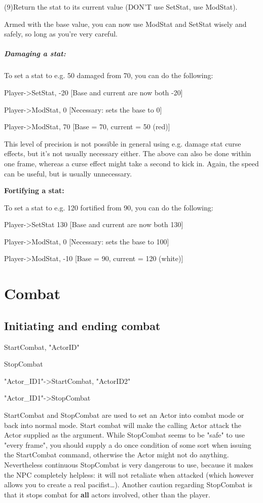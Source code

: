 \documentclass[
]{article}
\begin{document}
(9)Return the stat to its current value (DON'T use SetStat, use
ModStat).

Armed with the base value, you can now use ModStat and SetStat wisely
and safely, so long as you're very careful.

\hypertarget{damaging-a-stat}{%
\subparagraph{Damaging a stat:}\label{damaging-a-stat}}

To set a stat to e.g. 50 damaged from 70, you can do the following:

Player-\textgreater SetStat, -20 {[}Base and current are now both -20{]}

Player-\textgreater ModStat, 0 {[}Necessary: sets the base to 0{]}

Player-\textgreater ModStat, 70 {[}Base = 70, current = 50 (red){]}

This level of precision is not possible in general using e.g. damage
stat curse effects, but it's not usually necessary either. The above can
also be done within one frame, whereas a curse effect might take a
second to kick in. Again, the speed can be useful, but is usually
unnecessary.

\textbf{Fortifying a stat:}

To set a stat to e.g. 120 fortified from 90, you can do the following:

Player-\textgreater SetStat 130 {[}Base and current are now both 130{]}

Player-\textgreater ModStat, 0 {[}Necessary: sets the base to 100{]}

Player-\textgreater ModStat, -10 {[}Base = 90, current = 120 (white){]}

\hypertarget{combat}{%
\section{Combat}\label{combat}}

\hypertarget{initiating-and-ending-combat}{%
\subsection{Initiating and ending
combat}\label{initiating-and-ending-combat}}

StartCombat, "ActorID"

StopCombat

"Actor\_ID1"-\textgreater StartCombat, "ActorID2"

"Actor\_ID1"-\textgreater StopCombat

StartCombat and StopCombat are used to set an Actor into combat mode or
back into normal mode. Start combat will make the calling Actor attack
the Actor supplied as the argument. While StopCombat seems to be "safe"
to use "every frame", you should supply a do once condition of some sort
when issuing the StartCombat command, otherwise the Actor might not do
anything. Nevertheless continuous StopCombat is very dangerous to use,
because it makes the NPC completely helpless: it will not retaliate when
attacked (which however allows you to create a real pacifist\ldots).
Another caution regarding StopCombat is that it stops combat for
\textbf{all} actors involved, other than the player.
\end{document}
